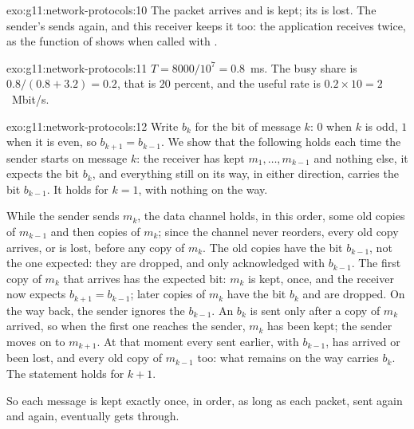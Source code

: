 \begin{solution}{exo:g11:network-protocols:10}
The packet  arrives and is kept; its  is lost. The sender's  sends 
again, and this receiver keeps it too: the application receives  twice, as the function 
of  shows when called with .
\end{solution}

\begin{solution}{exo:g11:network-protocols:11}
$T = 8000 / 10^7 = 0.8$~ms. The busy share is $0.8 / (0.8 + 3.2) = 0.2$, that is $20$ percent, and the useful rate is
$0.2 \times 10 = 2$~Mbit/s.
\end{solution}

\begin{solution}{exo:g11:network-protocols:12}
Write $b_k$ for the bit of message $k$: $0$ when $k$ is odd, $1$ when it is even, so $b_{k+1} = b_{k-1}$. We show that
the following holds each time the sender starts on message $k$: the receiver has kept $m_1, \dots, m_{k-1}$ and
nothing else, it expects the bit $b_k$, and everything still on its way, in either direction, carries the bit
$b_{k-1}$. It holds for $k = 1$, with nothing on the way.

While the sender sends $m_k$, the data channel holds, in this order, some old copies of $m_{k-1}$ and then copies of
$m_k$; since the channel never reorders, every old copy arrives, or is lost, before any copy of $m_k$. The old copies
have the bit $b_{k-1}$, not the one expected: they are dropped, and only acknowledged with $b_{k-1}$. The first copy
of $m_k$ that arrives has the expected bit: $m_k$ is kept, once, and the receiver now expects $b_{k+1} = b_{k-1}$;
later copies of $m_k$ have the bit $b_k$ and are dropped. On the way back, the sender ignores the 
$b_{k-1}$. An  $b_k$ is sent only after a copy of $m_k$ arrived, so when the first one reaches the
sender, $m_k$ has been kept; the sender moves on to $m_{k+1}$. At that moment every  sent earlier,
with $b_{k-1}$, has arrived or been lost, and every old copy of $m_{k-1}$ too: what remains on the way carries $b_k$.
The statement holds for $k + 1$.

So each message is kept exactly once, in order, as long as each packet, sent again and again, eventually gets
through.
\end{solution}


